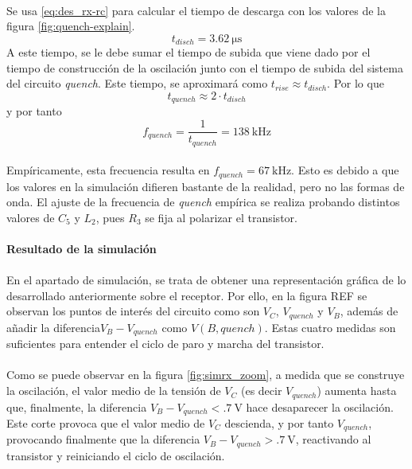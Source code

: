 \paragraph{}
Se usa \ref{eq:des_rx-rc} para calcular el tiempo de descarga con los valores de la figura \ref{fig:quench-explain}.
$$ t_{disch} = \SI{3.62}{\micro\second} $$
A este tiempo, se le debe sumar el tiempo de subida que viene dado por el tiempo de construcción de la oscilación junto con el tiempo de subida del sistema del circuito \textit{quench}.
Este tiempo, se aproximar\'a como $t_{rise} \approx t_{disch}$. Por lo que $$t_{quench} \approx 2 \cdot t_{disch}$$ y por tanto $$f_{quench} = \frac{1}{t_{quench}}  = \SI{138}{\kilo\hertz} $$
\paragraph{}
Empíricamente, esta frecuencia resulta en $f_{quench} = \SI{67}{\kilo\hertz}$. Esto es debido a que los valores en la simulación difieren bastante de la realidad, pero no las formas de onda. El ajuste de la frecuencia de \textit{quench} empírica se realiza probando distintos valores de $C_5$ y $L_2$, pues $R_3$ se fija al polarizar el transistor.

\paragraph{Resultado de la simulaci\'on} 
\paragraph{}
En el apartado de simulación, se trata de obtener una representación gráfica de lo desarrollado anteriormente sobre el receptor. Por ello, en la figura REF se observan los puntos de interés del circuito como son $V_C$, $V_{quench}$ y $V_{B}$, además de añadir la diferencia$V_B - V_{quench}$ como $V(B,quench)$. Estas cuatro medidas son suficientes para entender el ciclo de paro y marcha del transistor.
\paragraph{}
Como se puede observar en la figura \ref{fig:simrx_zoom}, a medida que se construye la oscilación, el valor medio de la tensión de $V_{C}$ (es decir $V_{quench}$) aumenta hasta que, finalmente, la diferencia $V_B - V_{quench} < \SI{.7}{\volt}$ hace desaparecer la oscilaci\'on. Este corte provoca que el valor medio de $V_C$ descienda, y por tanto $V_{quench}$, provocando finalmente que la diferencia $V_B - V_{quench} > \SI{.7}{\volt}$, reactivando al transistor y reiniciando el ciclo de oscilaci\'on.

